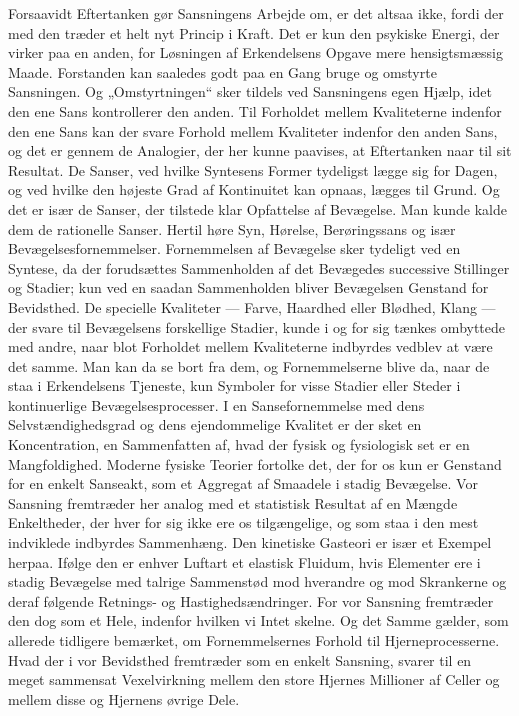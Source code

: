 \documentclass[12pt,a4paper]{book}
\newcommand{\apage}[1]{\marginnote{\footnotesize\textit{[#1]}}}
\begin{document}
Forsaavidt Eftertanken gør Sansningens Arbejde om, er det altsaa ikke,
fordi der med den træder et helt nyt Princip i Kraft. Det er kun den
psykiske Energi, der virker paa en anden, for Løsningen af Erkendelsens
Opgave mere hensigtsmæssig Maade. Forstanden kan saaledes godt paa en \apage{41}
Gang bruge og omstyrte Sansningen. Og „Omstyrtningen“ sker tildels ved
Sansningens egen Hjælp, idet den ene Sans kontrollerer den anden. Til
Forholdet mellem Kvaliteterne indenfor den ene Sans kan der svare
Forhold mellem Kvaliteter indenfor den anden Sans, og det er gennem de
Analogier, der her kunne paavises, at Eftertanken naar til sit Resultat.
De Sanser, ved hvilke Syntesens Former tydeligst lægge sig for Dagen, og
ved hvilke den højeste Grad af Kontinuitet kan opnaas, lægges til Grund.
Og det er især de Sanser, der tilstede klar Opfattelse af Bevægelse. Man
kunde kalde dem de rationelle Sanser. Hertil høre Syn, Hørelse,
Berøringssans og især Bevægelsesfornemmelser. Fornemmelsen af Bevægelse
sker tydeligt ved en Syntese, da der forudsættes Sammenholden af det
Bevægedes successive Stillinger og Stadier; kun ved en saadan
Sammenholden bliver Bevægelsen Genstand for Bevidsthed. De specielle
Kvaliteter --- Farve, Haardhed eller Blødhed, Klang --- der svare til
Bevægelsens forskellige Stadier, kunde i og for sig tænkes ombyttede med
andre, naar blot Forholdet mellem Kvaliteterne indbyrdes vedblev at være
det samme. Man kan da se bort fra dem, og Fornemmelserne blive da, naar
de staa i Erkendelsens Tjeneste, kun Symboler for visse Stadier eller
Steder i kontinuerlige Bevægelsesprocesser. I en Sansefornemmelse med
dens Selvstændighedsgrad og dens ejendommelige Kvalitet er der sket en
Koncentration, en Sammenfatten af, hvad der fysisk og fysiologisk set er
en Mangfoldighed. Moderne fysiske Teorier fortolke det, der for os kun
er Genstand for en enkelt Sanseakt, som et Aggregat af Smaadele i stadig
Bevægelse. Vor Sansning fremtræder her analog med et statistisk Resultat
af en Mængde Enkeltheder, der hver for sig ikke ere os tilgængelige, og
som staa i den mest indviklede indbyrdes Sammenhæng. Den kinetiske
Gasteori er især et Exempel herpaa. Ifølge den er enhver Luftart et
elastisk Fluidum, hvis Elementer ere i stadig Bevægelse med talrige
Sammenstød mod hverandre og mod Skrankerne og deraf følgende Retnings-
og Hastighedsændringer. For vor Sansning fremtræder den dog som et Hele, \apage{42}
indenfor hvilken vi Intet skelne. Og det Samme gælder, som allerede
tidligere bemærket, om Fornemmelsernes Forhold til Hjerneprocesserne.
Hvad der i vor Bevidsthed fremtræder som en enkelt Sansning, svarer til
en meget sammensat Vexelvirkning mellem den store Hjernes Millioner af
Celler og mellem disse og Hjernens øvrige Dele.
\end{document}
